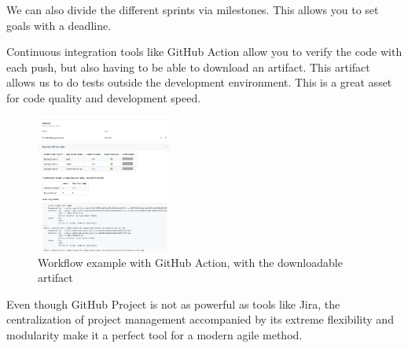 We can also divide the different sprints via milestones.
This allows you to set goals with a deadline.


\newpage

Continuous integration tools like GitHub Action allow you to verify the code with each push,
but also having to be able to download an artifact.
This artifact allows us to do tests outside the development environment.
This is a great asset for code quality and development speed.


\begin{figure}[h]
    \centering
    \includegraphics[width=0.4\textwidth]{img/GitHubAction}
    \caption{Workflow example with GitHub Action, with the downloadable artifact}
    \label{fig:GitHubAction}
\end{figure}


Even though GitHub Project is not as powerful as tools like Jira,
the centralization of project management accompanied by its extreme flexibility and modularity make it a perfect tool
for a modern agile method.
